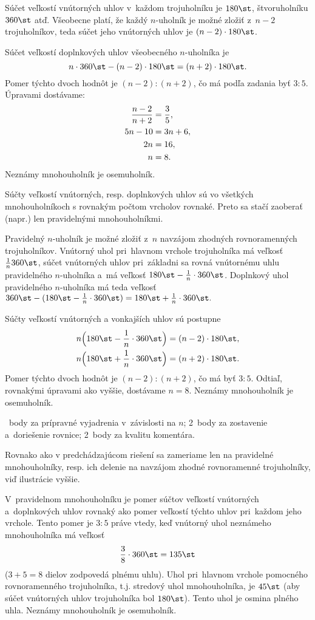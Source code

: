 {%
Súčet veľkostí vnútorných uhlov v~každom trojuholníku je $180\st$, štvoruholníku $360\st$ atď.
Všeobecne platí, že každý $n$-uholník je možné zložiť z~$n-2$ trojuholníkov, teda súčet jeho vnútorných uhlov je $(n-2)\cdot180\st$.
%

Súčet veľkostí doplnkových uhlov všeobecného $n$-uholníka je
$$
n\cdot360\st-(n-2)\cdot180\st=(n+2)\cdot180\st.
$$
Pomer týchto dvoch hodnôt je $(n-2):(n+2)$, čo má podľa zadania byť $3:5$.
Úpravami dostávame:
$$\aligned
\frac{n-2}{n+2} &=\frac35 , \\
5n-10 &=3n+6 , \\
2n &=16, \\
n &=8.
\endaligned
$$
Neznámy mnohouholník je osemuholník.

\ineriesenie
Súčty veľkostí vnútorných, resp. doplnkových uhlov sú vo všetkých mnohouholníkoch s rovnakým počtom vrcholov rovnaké.
Preto sa stačí zaoberať (napr.) len pravidelnými mnohouholníkmi.

Pravidelný $n$-uholník je možné zložiť z~$n$ navzájom zhodných rovnoramenných trojuholníkov.
Vnútorný uhol pri~hlavnom vrchole trojuholníka má veľkosť $\frac1n 360\st$, súčet vnútorných uhlov pri~základni sa rovná vnútornému uhlu pravidelného $n$-uholníka a~má veľkosť $180\st-\frac1n\cdot360\st$.
Doplnkový uhol pravidelného $n$-uholníka má teda veľkosť
$
360\st - (180\st-\frac1n\cdot360\st) =180\st+\frac1n\cdot360\st.
$
%

Súčty veľkostí vnútorných a vonkajších uhlov sú postupne
$$\aligned
&n\Big(180\st-\frac1n\cdot360\st\Big) =(n-2)\cdot180\st, \\
&n\Big(180\st+\frac1n\cdot360\st\Big) =(n+2)\cdot180\st.
\endaligned
$$
Pomer týchto dvoch hodnôt je $(n-2):(n+2)$, čo má byť $3:5$.
Odtiaľ, rovnakými úpravami ako vyššie, dostávame $n=8$.
Neznámy mnohouholník je osemuholník.

~body za prípravné vyjadrenia v~závislosti na $n$;
2~body za zostavenie a~doriešenie rovnice;
2~body za kvalitu komentára.
\endhodnotenie

\ineriesenie
Rovnako ako v predchádzajúcom riešení sa zameriame len na pravidelné mnohouholníky, resp. ich delenie na navzájom zhodné rovnoramenné trojuholníky, viď ilustrácie vyššie.

V~pravidelnom mnohouholníku je pomer súčtov veľkostí vnútorných a~doplnkových uhlov rovnaký ako pomer veľkostí týchto uhlov pri~každom jeho vrchole.
Tento pomer je $3:5$ práve vtedy, keď vnútorný uhol neznámeho mnohouholníka má veľkosť
$$
\frac38\cdot360\st =135\st
$$
($3+5=8$ dielov zodpovedá plnému uhlu).
Uhol pri~hlavnom vrchole pomocného rovnoramenného trojuholníka, t.j. stredový uhol mnohouholníka, je $45\st$
(aby súčet vnútorných uhlov trojuholníka bol $180\st$).
Tento uhol je osmina plného uhla.
Neznámy mnohouholník je osemuholník.

}
